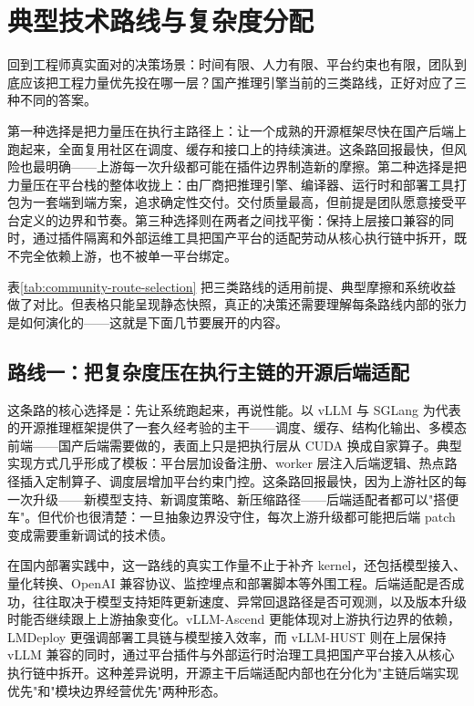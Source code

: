 \section{典型技术路线与复杂度分配}

回到工程师真实面对的决策场景：时间有限、人力有限、平台约束也有限，团队到底应该把工程力量优先投在哪一层？国产推理引擎当前的三类路线，正好对应了三种不同的答案。

第一种选择是把力量压在执行主路径上：让一个成熟的开源框架尽快在国产后端上跑起来，全面复用社区在调度、缓存和接口上的持续演进。这条路回报最快，但风险也最明确——上游每一次升级都可能在插件边界制造新的摩擦。第二种选择是把力量压在平台栈的整体收拢上：由厂商把推理引擎、编译器、运行时和部署工具打包为一套端到端方案，追求确定性交付。交付质量最高，但前提是团队愿意接受平台定义的边界和节奏。第三种选择则在两者之间找平衡：保持上层接口兼容的同时，通过插件隔离和外部运维工具把国产平台的适配劳动从核心执行链中拆开，既不完全依赖上游，也不被单一平台绑定。

表\ref{tab:community-route-selection} 把三类路线的适用前提、典型摩擦和系统收益做了对比。但表格只能呈现静态快照，真正的决策还需要理解每条路线内部的张力是如何演化的——这就是下面几节要展开的内容。

\subsection{路线一：把复杂度压在执行主链的开源后端适配}

这条路的核心选择是：先让系统跑起来，再说性能。以 vLLM 与 SGLang 为代表的开源推理框架提供了一套久经考验的主干——调度、缓存、结构化输出、多模态前端——国产后端需要做的，表面上只是把执行层从 CUDA 换成自家算子\citep{vllm,sglang,sglangpaper,vllmascend}。典型实现方式几乎形成了模板：平台层加设备注册、worker 层注入后端逻辑、热点路径插入定制算子、调度层增加平台约束门控。这条路回报最快，因为上游社区的每一次升级——新模型支持、新调度策略、新压缩路径——后端适配者都可以"搭便车"。但代价也很清楚：一旦抽象边界没守住，每次上游升级都可能把后端 patch 变成需要重新调试的技术债。

在国内部署实践中，这一路线的真实工作量不止于补齐 kernel，还包括模型接入、量化转换、OpenAI 兼容协议、监控埋点和部署脚本等外围工程。后端适配是否成功，往往取决于模型支持矩阵更新速度、异常回退路径是否可观测，以及版本升级时能否继续跟上上游抽象变化。vLLM-Ascend 更能体现对上游执行边界的依赖，LMDeploy 更强调部署工具链与模型接入效率，而 vLLM-HUST 则在上层保持 vLLM 兼容的同时，通过平台插件与外部运行时治理工具把国产平台接入从核心执行链中拆开\citep{vllmascend,lmdeploy,vllmhust}。这种差异说明，开源主干后端适配内部也在分化为"主链后端实现优先"和"模块边界经营优先"两种形态。

